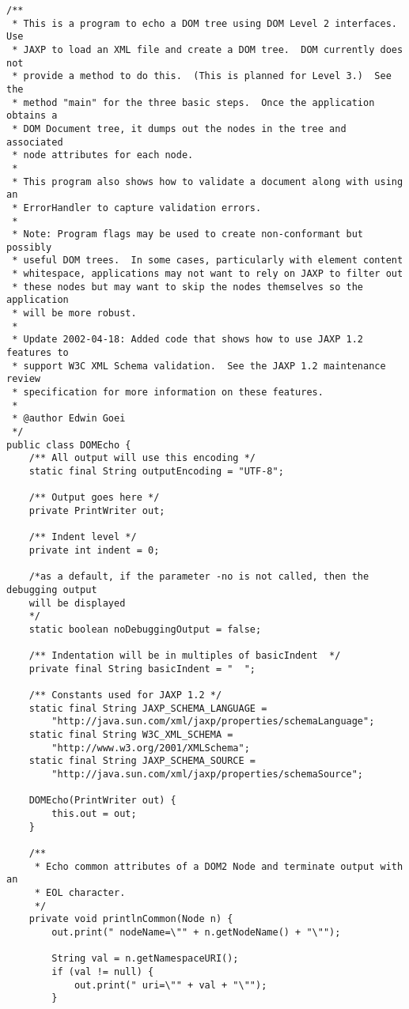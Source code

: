 \documentclass[11pt,english]{article}
\begin{document}
\begin{enumerate}
\begin{lstlisting}
/**
 * This is a program to echo a DOM tree using DOM Level 2 interfaces.  Use
 * JAXP to load an XML file and create a DOM tree.  DOM currently does not
 * provide a method to do this.  (This is planned for Level 3.)  See the
 * method "main" for the three basic steps.  Once the application obtains a
 * DOM Document tree, it dumps out the nodes in the tree and associated
 * node attributes for each node.
 *
 * This program also shows how to validate a document along with using an
 * ErrorHandler to capture validation errors.
 *
 * Note: Program flags may be used to create non-conformant but possibly
 * useful DOM trees.  In some cases, particularly with element content
 * whitespace, applications may not want to rely on JAXP to filter out
 * these nodes but may want to skip the nodes themselves so the application
 * will be more robust.
 *
 * Update 2002-04-18: Added code that shows how to use JAXP 1.2 features to
 * support W3C XML Schema validation.  See the JAXP 1.2 maintenance review
 * specification for more information on these features.
 *
 * @author Edwin Goei
 */
public class DOMEcho {
    /** All output will use this encoding */
    static final String outputEncoding = "UTF-8";

    /** Output goes here */
    private PrintWriter out;

    /** Indent level */
    private int indent = 0;

    /*as a default, if the parameter -no is not called, then the debugging output
    will be displayed
    */
    static boolean noDebuggingOutput = false; 

    /** Indentation will be in multiples of basicIndent  */
    private final String basicIndent = "  ";

    /** Constants used for JAXP 1.2 */
    static final String JAXP_SCHEMA_LANGUAGE =
        "http://java.sun.com/xml/jaxp/properties/schemaLanguage";
    static final String W3C_XML_SCHEMA =
        "http://www.w3.org/2001/XMLSchema";
    static final String JAXP_SCHEMA_SOURCE =
        "http://java.sun.com/xml/jaxp/properties/schemaSource";

    DOMEcho(PrintWriter out) {
        this.out = out;
    }

    /**
     * Echo common attributes of a DOM2 Node and terminate output with an
     * EOL character.
     */
    private void printlnCommon(Node n) {
        out.print(" nodeName=\"" + n.getNodeName() + "\"");

        String val = n.getNamespaceURI();
        if (val != null) {
            out.print(" uri=\"" + val + "\"");
        }


\end{lstlisting}
\end{enumerate}
\end{document}
